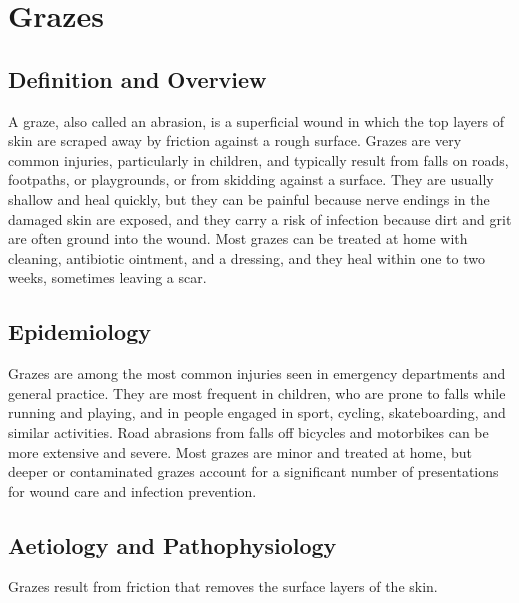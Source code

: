 \chapter{Grazes}

\section*{Definition and Overview}
A graze, also called an abrasion, is a superficial wound in which the top layers of skin are scraped away by friction against a rough surface. Grazes are very common injuries, particularly in children, and typically result from falls on roads, footpaths, or playgrounds, or from skidding against a surface. They are usually shallow and heal quickly, but they can be painful because nerve endings in the damaged skin are exposed, and they carry a risk of infection because dirt and grit are often ground into the wound. Most grazes can be treated at home with cleaning, antibiotic ointment, and a dressing, and they heal within one to two weeks, sometimes leaving a scar.

\section*{Epidemiology}
Grazes are among the most common injuries seen in emergency departments and general practice. They are most frequent in children, who are prone to falls while running and playing, and in people engaged in sport, cycling, skateboarding, and similar activities. Road abrasions from falls off bicycles and motorbikes can be more extensive and severe. Most grazes are minor and treated at home, but deeper or contaminated grazes account for a significant number of presentations for wound care and infection prevention.

\section*{Aetiology and Pathophysiology}
Grazes result from friction that removes the surface layers of the skin.

